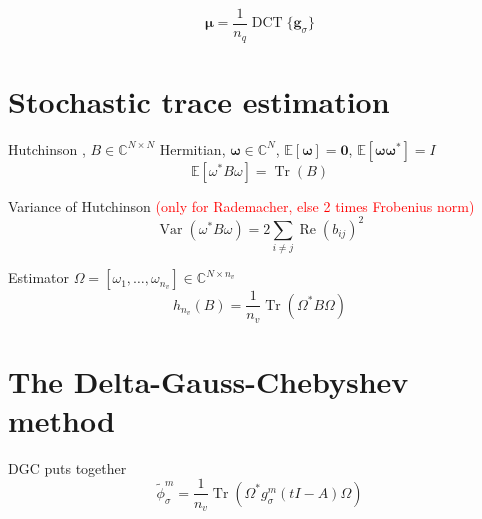 \begin{equation}
    \boldsymbol{\mu} = \frac{1}{n_q} \operatorname{DCT}\{\boldsymbol{g}_{\sigma}\}
    \label{equ:2-chebyshev-DCT-vector}
\end{equation}


\section{Stochastic trace estimation}
\label{sec:2-chebyshev-stochastic-trace-estimation}

Hutchinson \cite{hutchinson1990trace}, $B \in \mathbb{C}^{N \times N}$ Hermitian,
$\boldsymbol{\omega} \in \mathbb{C}^N$, $\mathbb{E}[\boldsymbol{\omega}] = \boldsymbol{0}$, $\mathbb{E}[\boldsymbol{\omega}\boldsymbol{\omega}^{\ast}] = I$ 
\begin{equation}
    \mathbb{E}[\omega^{\ast} B \omega] = \operatorname{Tr}(B)
    \label{equ:2-chebyshev-DGC-hutchinson}
\end{equation}

Variance of Hutchinson \cite[Proposition~1]{hutchinson1990trace} \textcolor{red}{(only for Rademacher, else 2 times Frobenius norm)}
\begin{equation}
    \operatorname{Var}(\omega^{\ast} B \omega) = 2 \sum_{i \neq j} \operatorname{Re}(b_{ij})^2
    \label{equ:2-chebyshev-DGC-hutchinson-variance}
\end{equation}

Estimator $\Omega = [\omega_1, \dots, \omega_{n_v}] \in \mathbb{C}^{N \times n_v}$
\begin{equation}
    h_{n_v}(B) = \frac{1}{n_v} \operatorname{Tr}(\Omega^{\ast} B \Omega)
    \label{equ:2-chebyshev-DGC-hutchionson-estimator}
\end{equation}


\section{The Delta-Gauss-Chebyshev method}
\label{sec:2-chebyshev-delta-gauss-chebyshev}

\gls{DGC} puts together
\begin{equation}
    \widetilde{\phi}_{\sigma}^m = \frac{1}{n_v} \operatorname{Tr}(\Omega^{\ast} g_{\sigma}^m(tI - A) \Omega)
    \label{equ:2-chebyshev-DGC-final-estimator}
\end{equation}

